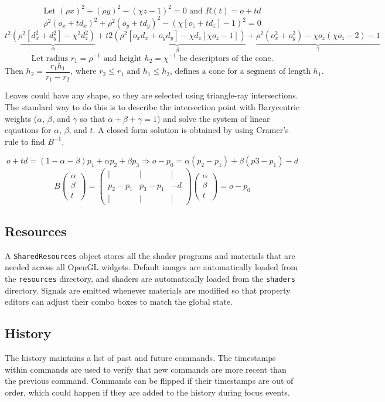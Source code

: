 \documentclass[10pt]{article}
\newcommand\m[1]{\begin{pmatrix}#1\end{pmatrix}}
\begin{document}
\[ \text{Let } (\rho x)^2 + (\rho y)^2 - (\chi z - 1)^2 = 0 \text{ and } R(t) = o + td \]
\[ \rho^2(o_x + td_x)^2 + \rho^2(o_y + td_y)^2 - (\chi[o_z + td_z] - 1)^2 = 0 \]
\[ t^2\underbrace{\left(\rho^2[d_x^2 + d_y^2] - \chi^2d_z^2\right)}_{\alpha} +
t\underbrace{2\left(\rho^2[o_xd_x + o_yd_y] - \chi d_z[\chi o_z-1]\right)}_{\beta} +
\underbrace{\rho^2\left(o_x^2 + o_y^2\right) - \chi o_z\left(\chi o_z-2\right) - 1}_{\gamma} \]
\[ \text{Let radius } r_1 = \rho^{-1} \text{ and height } h_2 = \chi^{-1} \text{ be descriptors of the cone.} \]
\[ \text{Then } h_2 = \frac{r_1h_1}{r_1-r_2} \text{, where } r_2 \le r_1 \text{ and } h_1 \le h_2 \text{, defines a cone for a segment of length } h_1 \text{.} \]

Leaves could have any shape, so they are selected using triangle-ray intersections. The standard way to do this is to describe the intersection point with Barycentric weights ($ \alpha $, $ \beta $, and $ \gamma $ so that $ \alpha + \beta + \gamma = 1 $) and solve the  system of linear equations for $ \alpha $, $ \beta $, and $ t $. A closed form solution is obtained by using Cramer's rule to find $ B^{-1} $.

\[ o + td = (1 - \alpha - \beta) p_1 + \alpha p_2 + \beta p_3 \Rightarrow o - p_0 = \alpha(p_2 - p_1) + \beta(p3 - p_1) - d \]
\[ B \m{\alpha \\ \beta \\ t} = \m{|&|&|\\ p_2 - p_1 & p_3 - p_1 & -d \\|&|&|} \m{\alpha \\ \beta \\ t} = o - p_0 \]

\subsection{Resources}
A \texttt{SharedResources} object stores all the shader programs and materials that are needed across all OpenGL widgets. Default images are automatically loaded from the \texttt{resources} directory, and shaders are automatically loaded from the \texttt{shaders} directory. Signals are emitted whenever materials are modified so that property editors can adjust their combo boxes to match the global state.

\subsection{History}
The history maintains a list of past and future commands. The timestamps within commands are used to verify that new commands are more recent than the previous command. Commands can be flipped if their timestamps are out of order, which could happen if they are added to the history during focus events.
\end{document}
